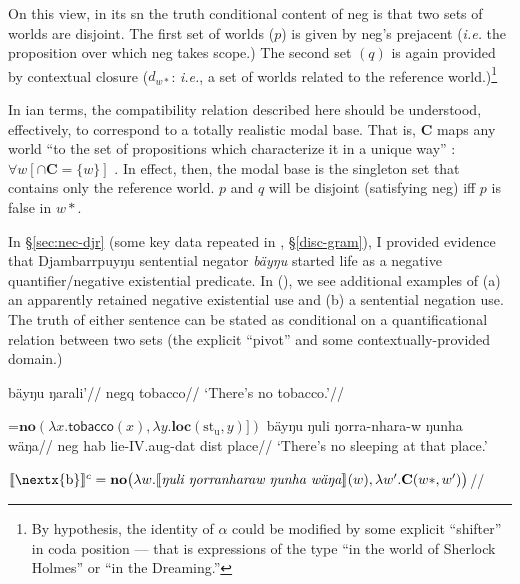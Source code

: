 On this view, in its \acrshort{sn} the truth conditional content of \gls{neg} is that two sets of worlds are disjoint. The first set of worlds ($ p $) is given by \gls{neg}'s prejacent (\textit{i.e.} the proposition over which \gls{neg} takes scope.) The second set $ (q) $ is again provided by contextual closure ($ d_{w*} $: \textit{i.e.}, a set of worlds related to the reference world.)\footnote{By hypothesis, the identity of $ \alpha $ could be modified by some explicit ``shifter'' in coda position --- that is expressions of the type ``in the world of Sherlock Holmes'' or ``in the Dreaming.''}

In \citeauthor{Kratzer1981}ian terms, the compatibility relation described here should be understood, effectively, to correspond to a totally realistic modal base. That is, \textbf{C} maps any world ``to the set of propositions which characterize it in a unique way'' : $ \forall w[\cap\mathbf C=\{w\}] $ \citeyearpar[296]{Kratzer1981}. In effect, then, the modal base is the singleton set that contains only the reference world. $ p $ and $ q $ will be disjoint (satisfying \gls{neg}) iff $ p $ is false in $ w* $.


In \S\ref{sec:nec-djr} (some key data repeated in , \S\ref{disc-gram}), I provided evidence that Djambarrpuyŋu sentential negator \textit{bäyŋu} started life as a negative quantifier/negative existential predicate. In (\nextx), we see additional examples of (a) an apparently retained negative existential use and (b) a sentential negation use. The truth of either sentence can be stated as conditional on a quantificational relation between two sets (the explicit ``pivot'' and some contextually-provided domain.)


\pex\a\begingl\gla bäyŋu ŋarali'//
\glb \gls{negq} tobacco//
\glft`There's no tobacco.'\trailingcitation{[AW~20180731]}//\endgl

=$ \mathbf{no}(\lambda x.\mathsf{tobacco}(x),\lambda y.\textbf{loc}(\mathrm{st_u},y)]) $%
\a{} \begingl\gla {}bäyŋu ŋuli ŋorra-nhara-w ŋunha wäŋa//
\glb\gls{neg} \gls{hab} lie-\gls{IV}.\gls{aug}-\gls{dat} \gls{dist} place//
\glft`There's no sleeping at that place.'\trailingcitation{[AW~20190501]}


$ \denote[c]{\text{\nextx{b}}}=\textbf{no}\big(\lambda w.\denote{\textit{ŋuli ŋorranharaw ŋunha wäŋa}}(w),\lambda w'.\textbf{C}(w*,w')\big) $//\endgl
\xe



